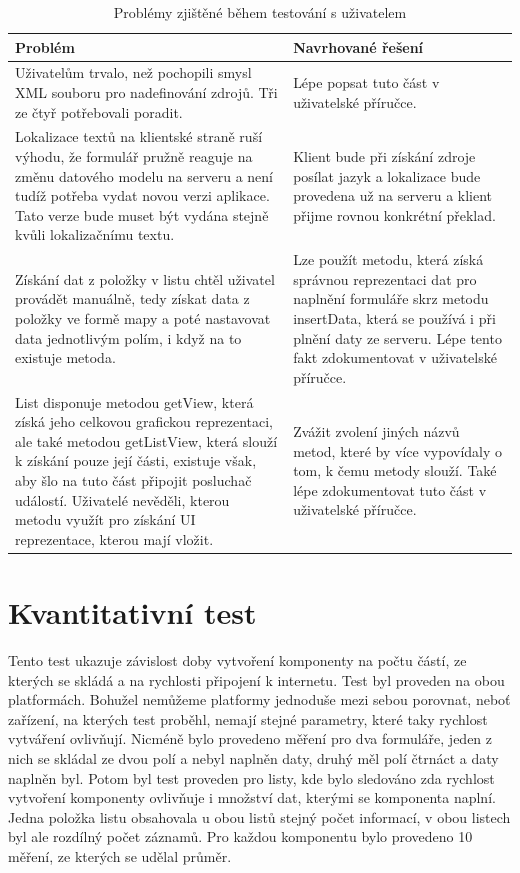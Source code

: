 \begin{table}[h!]
\begin{center}
\caption{Problémy zjištěné během testování s uživatelem}
\label{table:testIssues}
\begin{tabular}{|p{7cm}|p{7cm}|}
\hline
\textbf{Problém} & \textbf{Navrhované řešení} \\
\hline
Uživatelům trvalo, než pochopili smysl XML souboru pro nadefinování zdrojů. Tři ze čtyř potřebovali poradit. & Lépe popsat tuto část v uživatelské příručce. \\
\hline
Lokalizace textů na klientské straně ruší výhodu, že formulář pružně reaguje na změnu datového modelu na serveru a není tudíž potřeba vydat novou verzi aplikace. Tato verze bude muset být vydána stejně kvůli lokalizačnímu textu. & Klient bude při získání zdroje posílat jazyk a lokalizace bude provedena už na serveru a klient přijme rovnou konkrétní překlad. \\
\hline
Získání dat z položky v listu chtěl uživatel provádět manuálně, tedy získat data z položky ve formě mapy a poté nastavovat data jednotlivým polím, i když na to existuje metoda. & Lze použít metodu, která získá správnou reprezentaci dat pro naplnění formuláře skrz metodu insertData, která se používá i při plnění daty ze serveru. Lépe tento fakt zdokumentovat v uživatelské příručce. \\
\hline
List disponuje metodou getView, která získá jeho celkovou grafickou reprezentaci, ale také metodou getListView, která slouží k získání pouze její části, existuje však, aby šlo na tuto část připojit posluchač událostí. Uživatelé nevěděli, kterou metodu využít pro získání UI reprezentace, kterou mají vložit. & Zvážit zvolení jiných názvů metod, které by více vypovídaly o tom, k čemu metody slouží. Také lépe zdokumentovat tuto část v uživatelské příručce. \\
\hline
\end{tabular}
\end{center}
\end{table}

\section{Kvantitativní test} 
Tento test ukazuje závislost doby vytvoření komponenty na počtu částí, ze kterých se skládá a na rychlosti připojení k internetu. Test byl proveden na obou platformách. Bohužel nemůžeme platformy jednoduše mezi sebou porovnat, neboť zařízení, na kterých test proběhl, nemají stejné parametry, které taky rychlost vytváření ovlivňují. Nicméně bylo provedeno měření pro dva formuláře, jeden z nich se skládal ze dvou polí a nebyl naplněn daty, druhý měl polí čtrnáct a daty naplněn byl. Potom byl test proveden pro listy, kde bylo sledováno zda rychlost vytvoření komponenty ovlivňuje i množství dat, kterými se komponenta naplní. Jedna položka listu obsahovala u obou listů stejný počet informací, v obou listech byl ale rozdílný počet záznamů. Pro každou komponentu bylo provedeno 10 měření, ze kterých se udělal průměr. 

